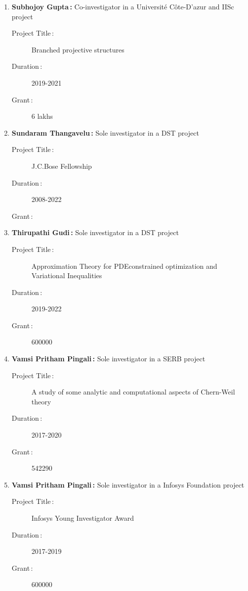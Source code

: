 \begin{enumerate}
\item {\bf Subhojoy Gupta\,:} Co-investigator in a Université Côte-D'azur and IISc project
\begin{description}
  \item[Project Title\,:] Branched projective structures
  \item[Duration\,:] 2019-2021
  \item[Grant\,:] 6 lakhs
\end{description}


\item {\bf Sundaram Thangavelu\,:} Sole investigator in a DST project
\begin{description}
  \item[Project Title\,:] J.C.Bose Fellowship
  \item[Duration\,:] 2008-2022
  \item[Grant\,:] 
\end{description}


\item {\bf Thirupathi Gudi\,:} Sole investigator in a DST project
\begin{description}
  \item[Project Title\,:] Approximation Theory for PDEconstrained optimization and Variational Inequalities
  \item[Duration\,:] 2019-2022
  \item[Grant\,:] 600000
\end{description}


\item {\bf Vamsi Pritham Pingali\,:} Sole investigator in a SERB project
\begin{description}
  \item[Project Title\,:] A study of some analytic and computational aspects of Chern-Weil theory
  \item[Duration\,:] 2017-2020
  \item[Grant\,:] 542290
\end{description}


\item {\bf Vamsi Pritham Pingali\,:} Sole investigator in a Infosys Foundation project
\begin{description}
  \item[Project Title\,:] Infosys Young Investigator Award
  \item[Duration\,:] 2017-2019
  \item[Grant\,:] 600000
\end{description}

\end{enumerate}


